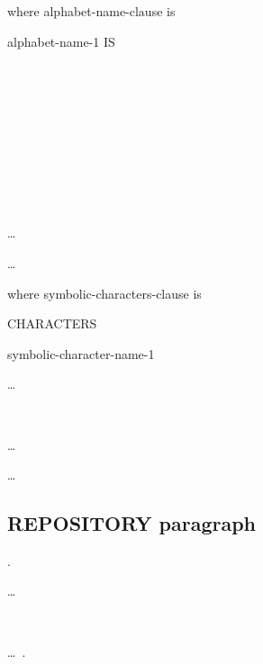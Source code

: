 where alphabet-name-clause is

 alphabet-name-1 IS
\begin{1=}
   \\
   \\
   \\
   \\
   \\
  \begin{1=}
    \literal
    \begin{0-1}
      \begin{1=}
         \\
      \end{1=}
      \literal \\
      \begin{1=}
         \literal
      \end{1=}\ldots
    \end{0-1}
  \end{1=}\ldots
\end{1=}

where symbolic-characters-clause is

 CHARACTERS
\begin{1=}
  \begin{1=}
    symbolic-character-name-1
  \end{1=}\ldots
  \begin{1=}
     \\
  \end{1=}
  \begin{1=}
    \integer
  \end{1=}\ldots
\end{1=}\ldots
\begin{0-1}
   
\end{0-1}

\subsection{REPOSITORY paragraph}

.

\begin{0-1}
  \begin{1=}
    \begin{1=}
      \begin{1=}
        \functionname
      \end{1=}\ldots \\

    \end{1=}
     \\

     \functionname
    \begin{0-1}
       \literal
    \end{0-1}
  \end{1=}\ldots\ {}.
\end{0-1}


